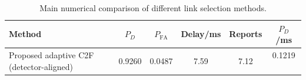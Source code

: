 \begin{table}[t]
    \centering
    \caption{Main numerical comparison of different link selection methods.}
    \label{tab:main_summary}
    \begin{tabular}{l c c c c c}
        \hline
        Method & $P_D$ & $P_{\mathrm{FA}}$ & Delay/ms & Reports & $P_D$/ms \\
        \hline
        Proposed adaptive C2F (detector-aligned) & 0.9260 & 0.0487 & 7.59 & 7.12 & 0.1219 \
        \hline
    \end{tabular}
\end{table}

